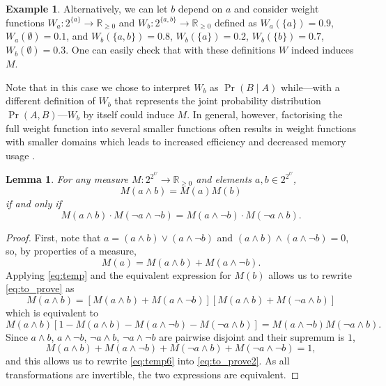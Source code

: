 \documentclass{article}
\newtheorem{lemma}{Lemma}
\theoremstyle{definition}
\newtheorem{example}{Example}
\theoremstyle{remark}
\begin{document}
{\begin{example}
  Alternatively, we can let $b$ depend on $a$ and consider weight functions
  $W_a\colon 2^{\{a\}} \to \mathbb{R}_{\ge 0}$ and $W_b\colon 2^{\{a, b\}} \to
  \mathbb{R}_{\ge 0}$ defined as $W_a(\{a\}) = 0.9$, $W_a(\emptyset) = 0.1$, and
  $W_b(\{a, b\}) = 0.8$, $W_b(\{a\}) = 0.2$, $W_b(\{b\}) = 0.7$, $W_b(\emptyset)
  = 0.3$. One can easily check that with these definitions $W$ indeed induces
  $M$.
\end{example}

Note that in this case we chose to interpret $W_b$ as $\Pr(B \mid A)$
while---with a different definition of $W_b$ that represents the joint
probability distribution $\Pr(A, B)$---$W_b$ by itself could induce $M$. In
general, however, factorising the full weight function into several smaller
functions often results in weight functions with smaller domains which leads to
increased efficiency and decreased memory usage \cite{DBLP:conf/aaai/DudekPV20}.

\begin{lemma} \label{lemma:before_theorem}
  For any measure $M\colon 2^{2^U} \to \mathbb{R}_{\ge 0}$ and elements $a, b
  \in 2^{2^U}$,
  \begin{equation} \label{eq:to_prove}
    M(a \land b) = M(a)M(b)
  \end{equation}
  if and only if
  \begin{equation} \label{eq:to_prove2}
    M(a \land b) \cdot M(\neg a \land \neg b) = M(a \land \neg b)
    \cdot M(\neg a \land b).
  \end{equation}
\end{lemma}
\begin{proof}
  First, note that $a = (a \land b) \lor (a \land \neg b)$ and $(a \land b)
  \land (a \land \neg b) = 0$, so, by properties of a measure,
  \begin{equation} \label{eq:temp}
    M(a) = M(a \land b) + M(a \land \neg b).
  \end{equation}
  Applying \cref{eq:temp} and the equivalent expression for $M(b)$ allows us
  to rewrite \cref{eq:to_prove} as
  \[
    M(a \land b) = [M(a \land b) + M(a \land \neg b)][M(a \land b) + M(\neg a
    \land b)]
  \]
  which is equivalent to
  \begin{equation} \label{eq:temp6}
    M(a \land b)[1 - M(a \land b) - M(a \land \neg b) - M(\neg a \land b)] = M(a
    \land \neg b)M(\neg a \land b).
  \end{equation}
  Since $a \land b$, $a \land \neg b$, $\neg a \land b$, $\neg a \land \neg b$
  are pairwise disjoint and their supremum is $1$,
  \[
    M(a \land b) + M(a \land \neg b) + M(\neg a \land b) + M(\neg a \land \neg
    b) = 1,
  \]
  and this allows us to rewrite \cref{eq:temp6} into \cref{eq:to_prove2}. As all
  transformations are invertible, the two expressions are equivalent.
\end{proof}

}
\end{document}
